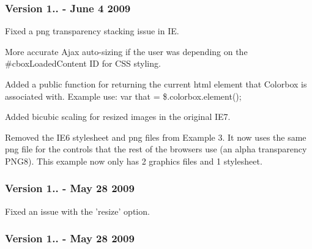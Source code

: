 \subsubsection*{Version 1.. -\/ June 4 2009}


\begin{DoxyItemize}
\item Fixed a png transparency stacking issue in I\-E.
\item More accurate Ajax auto-\/sizing if the user was depending on the \#cbox\-Loaded\-Content I\-D for C\-S\-S styling.
\item Added a public function for returning the current html element that Colorbox is associated with. Example use\-: var that = \$.colorbox.\-element();
\item Added bicubic scaling for resized images in the original I\-E7.
\item Removed the I\-E6 stylesheet and png files from Example 3. It now uses the same png file for the controls that the rest of the browsers use (an alpha transparency P\-N\-G8). This example now only has 2 graphics files and 1 stylesheet.
\end{DoxyItemize}

\subsubsection*{Version 1.. -\/ May 28 2009}


\begin{DoxyItemize}
\item Fixed an issue with the 'resize' option.
\end{DoxyItemize}

\subsubsection*{Version 1.. -\/ May 28 2009}


